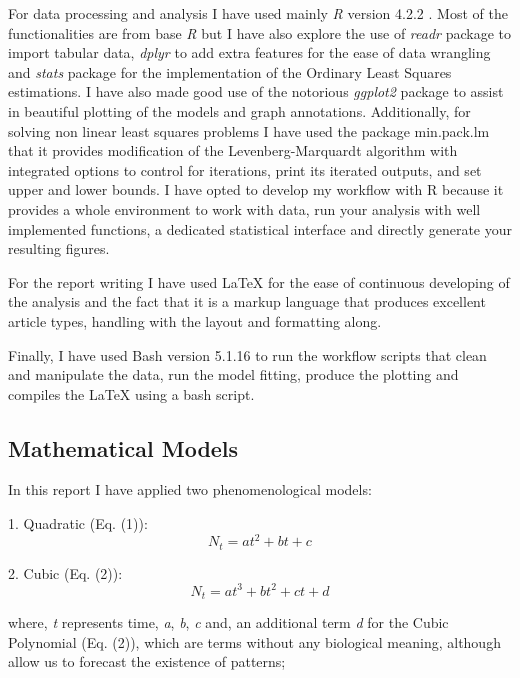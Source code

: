 \documentclass[11]{article}
\begin{document}
For data processing and analysis I have used mainly \emph{R} version 4.2.2 \cite{R_citation}. Most of the functionalities are from base \emph{R} but I have also explore the use of \emph{readr} \cite{readrcitation} package to import tabular data, \emph{dplyr} \cite{dplyrcitation} to add extra features for the ease of data wrangling and \emph{stats} \cite{R_citation} package for the implementation of the Ordinary Least Squares estimations. I have also made good use of the notorious \emph{ggplot2} \cite{ggplot2citation} package to assist in beautiful plotting of the models and graph annotations. Additionally, for solving non linear least squares problems I have used the package min.pack.lm \cite{elzhov2010r} that it provides modification of the Levenberg-Marquardt algorithm with integrated options to control for iterations,  print its iterated outputs, and set upper and lower bounds. I have opted to develop my workflow with R because it provides a whole environment to work with data, run your analysis with well implemented functions, a dedicated statistical interface and directly generate your resulting figures.

For the report writing I have used LaTeX for the ease of continuous developing of the analysis and the fact that it is a markup language that produces excellent article types, handling with the layout and formatting along.

Finally, I have used Bash version 5.1.16 \cite{gnu2007free} to run the workflow scripts that clean and manipulate the data, run the model fitting, produce the plotting and compiles the LaTeX using a bash script.
\newline


\subsection{Mathematical Models}

In this report I have applied two phenomenological models:

1. Quadratic (Eq. (1)):
\begin{equation}
    N_t = at^2 + bt + c
\end{equation}

2. Cubic (Eq. (2)):
\begin{equation}
    N_t = at^3 + bt^2 + ct + d
\end{equation}

where, \emph{t} represents time, \emph{a}, \emph{b}, \emph{c} and, an additional term \emph{d} for the Cubic Polynomial (Eq. (2)), which are terms without any biological meaning, although allow us to forecast the existence of patterns;
\newline
\end{document}
